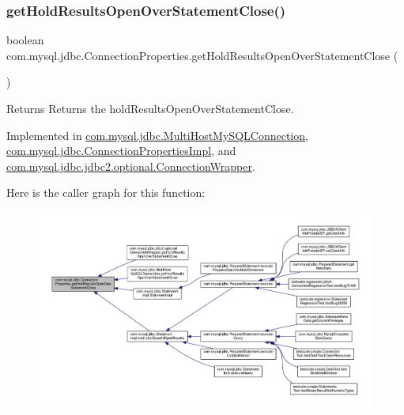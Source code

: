 \subsubsection{\texorpdfstring{get\+Hold\+Results\+Open\+Over\+Statement\+Close()}{getHoldResultsOpenOverStatementClose()}}
{\footnotesize\ttfamily boolean com.\+mysql.\+jdbc.\+Connection\+Properties.\+get\+Hold\+Results\+Open\+Over\+Statement\+Close (\begin{DoxyParamCaption}{ }\end{DoxyParamCaption})}

\begin{DoxyReturn}{Returns}
Returns the hold\+Results\+Open\+Over\+Statement\+Close. 
\end{DoxyReturn}


Implemented in \mbox{\hyperlink{classcom_1_1mysql_1_1jdbc_1_1_multi_host_my_s_q_l_connection_a7dd4373e730d9de2a0a47b5670e157ef}{com.\+mysql.\+jdbc.\+Multi\+Host\+My\+S\+Q\+L\+Connection}}, \mbox{\hyperlink{classcom_1_1mysql_1_1jdbc_1_1_connection_properties_impl_a99c840bb883ead93ee8941a3a46b18fb}{com.\+mysql.\+jdbc.\+Connection\+Properties\+Impl}}, and \mbox{\hyperlink{classcom_1_1mysql_1_1jdbc_1_1jdbc2_1_1optional_1_1_connection_wrapper_a9c65556621e7f08517f84c8114f92d39}{com.\+mysql.\+jdbc.\+jdbc2.\+optional.\+Connection\+Wrapper}}.

Here is the caller graph for this function\+:\nopagebreak
\begin{figure}[H]
\begin{center}
\leavevmode
\includegraphics[width=350pt]{interfacecom_1_1mysql_1_1jdbc_1_1_connection_properties_a33f1647a0e97bcb10d880500fc9e8cf0_icgraph}
\end{center}
\end{figure}
\mbox{\label{interfacecom_1_1mysql_1_1jdbc_1_1_connection_properties_a691575c40598ee5b000bed491d3ef096}} 
